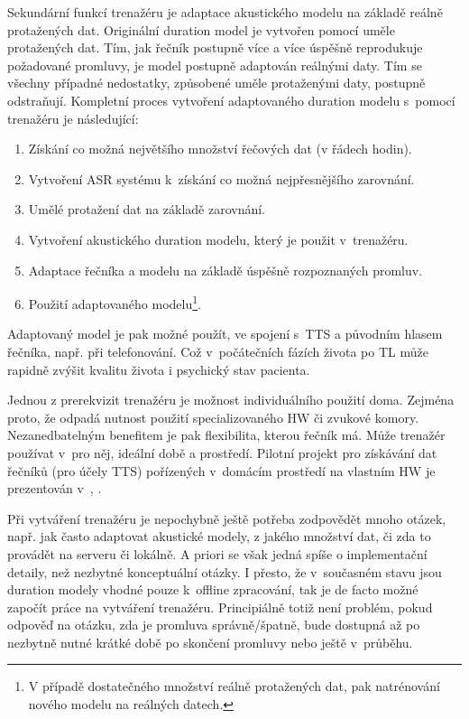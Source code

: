 Sekundární funkcí trenažéru je adaptace akustického modelu na základě reálně protažených dat. Originální duration model je vytvořen pomocí uměle protažených dat. Tím, jak řečník postupně více a více úspěšně reprodukuje požadované promluvy, je model postupně adaptován reálnými daty. Tím se všechny případné nedostatky, způsobené uměle protaženými daty, postupně odstraňují. Kompletní proces vytvoření adaptovaného duration modelu s~pomocí trenažéru je následující:

\begin{enumerate}
  \item Získání co možná největšího množství řečových dat (v řádech hodin).
  \item Vytvoření ASR systému  k~získání co možná nejpřesnějšího zarovnání.
  \item Umělé protažení dat na základě zarovnání.
  \item Vytvoření akustického duration modelu, který je použit v~trenažéru.
  \item Adaptace řečníka a modelu na základě úspěšně rozpoznaných promluv.
  \item Použití adaptovaného modelu\footnote{V případě dostatečného množství reálně protažených dat, pak natrénování nového modelu na reálných datech.}.
\end{enumerate}

\noindent Adaptovaný model je pak možné použít, ve spojení s~TTS a původním hlasem řečníka, např. při telefonování. Což v~počátečních fázích života po TL může rapidně zvýšit kvalitu života i psychický stav pacienta. \cite{Mertl2018}

Jednou z prerekvizit trenažéru je možnost individuálního použití doma. Zejména proto, že odpadá nutnost použití specializovaného HW  či zvukové komory. Nezanedbatelným benefitem je pak flexibilita, kterou řečník má. Může trenažér používat v~pro něj, ideální době a prostředí. Pilotní projekt pro získávání dat řečníků (pro účely TTS) pořízených v~domácím prostředí na vlastním HW je prezentován v~\cite{Juzova2015}, \cite{Juzova2017}.

Při vytváření trenažéru je nepochybně ještě potřeba zodpovědět mnoho otázek,  např. jak často adaptovat akustické modely, z jakého množství dat, či zda to provádět na serveru či lokálně. A priori se však jedná spíše o implementační detaily, než nezbytné konceptuální otázky. I přesto, že v~současném stavu jsou duration modely vhodné pouze  k~offline zpracování, tak je de facto možné započít práce na vytváření trenažéru. Principiálně totiž není problém, pokud odpověď na otázku, zda je promluva správně/špatně, bude dostupná až po nezbytně nutné krátké době po skončení promluvy nebo ještě v~průběhu.

